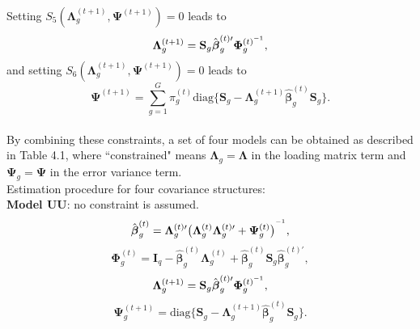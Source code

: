 \documentclass[12pt]{article}
\newcommand{\vecI}{\mathbf{I}}
\newcommand{\inv}{^{\raisebox{.2ex}{$\scriptscriptstyle-1$}}}
\begin{document}
Setting $S_5 (\mathbf{\Lambda}_g^{(t+1)}, \mathbf{\Psi}^{(t+1)}) = 0$ leads to 
\begin{equation*}
\mathbf{\Lambda}_g^{(t+1)} = \mathbf{S}_g \hat{\boldsymbol{\beta}}
_g^{(t) \prime}{\mathbf{\Phi}}_g^{(t) \inv},
\end{equation*}
and setting $S_6(\mathbf{\Lambda}_g^{(t+1)}, \mathbf{\Psi}^{(t+1)}) = 0$ leads to 
\begin{equation*}
\mathbf{\Psi}^{(t+1)} = \sum_{g=1}^G \pi_g^{(t)} \text{diag}\{\mathbf{S}_g - \mathbf{\Lambda}_g^{(t+1)}\hat{\boldsymbol{\beta}}_g^{(t)} \mathbf{S}_g\}.
\end{equation*}
\\
\noindent By combining these constraints, a set of four models can be obtained as described in Table 4.1, where ``constrained" means $\mathbf{\Lambda}_g  =\mathbf{\Lambda} $ in the loading matrix term and $ \mathbf{\Psi}_g =  \mathbf{\Psi}$  in the error variance term. \\

\noindent Estimation procedure for four covariance structures: \\
\textbf{Model UU}: no constraint is assumed.
\begin{equation*}
\hat{\boldsymbol{\beta}}_g^{(t)} = \mathbf{\Lambda}_g^{(t) \prime} \big(\mathbf{\Lambda}_g^{(t)} \mathbf{\Lambda}_g^{(t) \prime} + \mathbf{\Psi}_g^{(t)} \big)^{\inv},
\end{equation*}
\begin{equation*}
\mathbf{\Phi}_g^{(t)} = \vecI_q - \hat{\boldsymbol{\beta}}_g^{(t)} \mathbf{\Lambda}_g^{(t)} +  \hat{\boldsymbol{\beta}}_g^{(t)} \mathbf{S}_g \hat{\boldsymbol{\beta}}_g^{(t) \prime},
\end{equation*}
\begin{equation*}
\mathbf{\Lambda}_g^{(t+1)} = \mathbf{S}_g \hat{\boldsymbol{\beta}}_g^{(t) \prime}{\mathbf{\Phi}}_g^{(t) \inv},
\end{equation*}
\begin{equation*}
\mathbf{\Psi}_g^{(t+1)} = \text{diag}\{\mathbf{S}_g - \mathbf{\Lambda}_g^{(t+1)}\hat{\boldsymbol{\beta}}_g^{(t)} \mathbf{S}_g\}.
\end{equation*}
\end{document}
